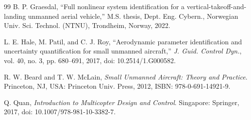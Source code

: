 \documentclass{ieeeaccess}
\begin{document}
\begin{thebibliography}{99}
 B. P. Graesdal, ``Full nonlinear system identification for a vertical-takeoff-and-landing unmanned aerial vehicle,'' M.S. thesis, Dept. Eng. Cybern., Norwegian Univ. Sci. Technol. (NTNU), Trondheim, Norway, 2022.

 L. E. Hale, M. Patil, and C. J. Roy, ``Aerodynamic parameter identification and uncertainty quantification for small unmanned aircraft,'' \textit{J. Guid. Control Dyn.}, vol. 40, no. 3, pp. 680--691, 2017, doi: 10.2514/1.G000582.

 R. W. Beard and T. W. McLain, \textit{Small Unmanned Aircraft: Theory and Practice}. Princeton, NJ, USA: Princeton Univ. Press, 2012, ISBN: 978-0-691-14921-9.

 Q. Quan, \textit{Introduction to Multicopter Design and Control}. Singapore: Springer, 2017, doi: 10.1007/978-981-10-3382-7.

\end{thebibliography}

\EOD
\end{document}
